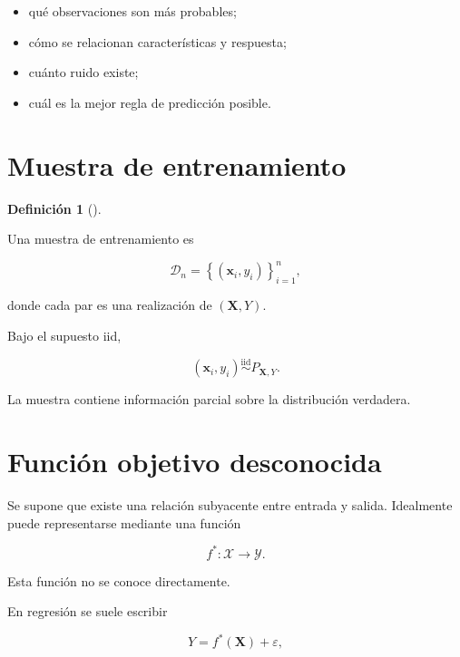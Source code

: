 \documentclass[
  spanish,
  10.5pt,
  letterpaper,
  DIV=11,
  numbers=noendperiod,
  oneside,
  open=any]{scrreprt}
\providecommand{\tightlist}{%
  \setlength{\itemsep}{0pt}\setlength{\parskip}{0pt}}
\theoremstyle{definition}
\newtheorem{definition}{Definición}[chapter]
\theoremstyle{definition}
\theoremstyle{plain}
\theoremstyle{remark}
\begin{document}
\begin{itemize}
\tightlist
\item
  qué observaciones son más probables;
\item
  cómo se relacionan características y respuesta;
\item
  cuánto ruido existe;
\item
  cuál es la mejor regla de predicción posible.
\end{itemize}

\section*{Muestra de entrenamiento}\label{muestra-de-entrenamiento}


\begin{definition}[]\protect\hypertarget{def-muestra-entrenamiento}{}\label{def-muestra-entrenamiento}

Una muestra de entrenamiento es

\[
\mathcal{D}_n
=
\left\{
(\mathbf{x}_i,y_i)
\right\}_{i=1}^{n},
\]

donde cada par es una realización de \((\mathbf{X},Y)\).

\end{definition}

Bajo el supuesto iid,

\[
(\mathbf{x}_i,y_i)
\overset{\text{iid}}{\sim}
P_{\mathbf{X},Y}.
\]

La muestra contiene información parcial sobre la distribución verdadera.

\section*{Función objetivo
desconocida}\label{funciuxf3n-objetivo-desconocida-1}


Se supone que existe una relación subyacente entre entrada y salida.
Idealmente puede representarse mediante una función

\[
f^{*}:\mathcal{X}\to\mathcal{Y}.
\]

Esta función no se conoce directamente.

En regresión se suele escribir

\[
Y
=
f^{*}(\mathbf{X})
+
\varepsilon,
\]
\end{document}
